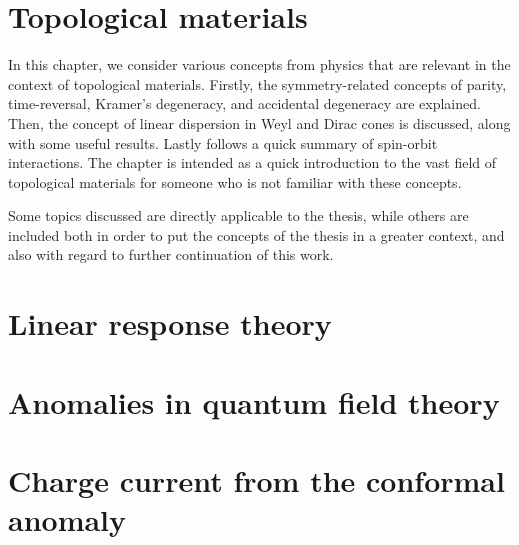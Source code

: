 \documentclass[
fontsize=11pt,
paper=B5,
BCOR=5mm,
]{scrbook}
\begin{document}
% 
\frontmatter
{}


\tableofcontents

\mainmatter
{}


\chapter{Topological materials}
In this chapter, we consider various concepts from physics that are relevant in the context of topological materials.
Firstly, the symmetry-related concepts of parity, time-reversal, Kramer's degeneracy, and accidental degeneracy are explained.
Then, the concept of linear dispersion in Weyl and Dirac cones is discussed, along with some useful results.
Lastly follows a quick summary of spin-orbit interactions.
The chapter is intended as a quick introduction to the vast field of topological materials for someone who is not familiar with these concepts.

Some topics discussed are directly applicable to the thesis, while others are included both in order to put the concepts of the thesis in a greater context, and also with regard to further continuation of this work.








\chapter{Linear response theory}


\chapter{Anomalies in quantum field theory}


\chapter{Charge current from the conformal anomaly}\label{ch:charge-current}





\end{document}
